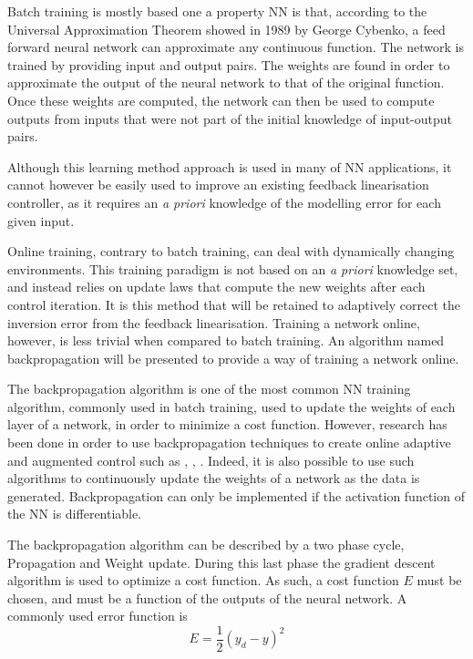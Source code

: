 Batch training is mostly based one a property NN is that, according to the Universal Approximation Theorem showed in 1989 by George Cybenko, a feed forward neural network can approximate any continuous function. The network is trained by providing input and output pairs. The weights are found in order to approximate the output of the neural network to that of the original function. Once these weights are computed, the network can then be used to compute outputs from inputs that were not part of the initial knowledge of input-output pairs.

Although this learning method approach is used in many of NN applications, it cannot however be easily used to improve an existing feedback linearisation  controller, as it requires an \textit{a priori} knowledge of the modelling error for each given input.

Online training, contrary to batch training, can deal with dynamically changing environments. This training paradigm is not based on an \textit{a priori} knowledge set, and instead relies on update laws that compute the new weights after each control iteration. It is this method that will be retained to adaptively correct the inversion error from the feedback linearisation. Training a network online, however, is less trivial when compared to batch training. An algorithm named backpropagation will be presented to provide a way of training a network online.  


The backpropagation algorithm is one of the most common NN training algorithm, commonly used in batch training, used to update the weights of each layer of a network, in order to minimize a cost function. However, research has been done in order to use backpropagation techniques to create online adaptive and augmented control such as \cite{online_adaptiveNN}, \cite{UAV_adaptive}, \cite{UAV_adaptive2}. Indeed, it is also possible to use such algorithms to continuously update the weights of a network as the data is generated. Backpropagation can only be implemented if the activation function of the NN is differentiable. 

The backpropagation algorithm can be described by a two phase cycle, Propagation and Weight update. During this last phase the gradient descent algorithm is used to optimize a cost function. As such, a cost function $E$ must be chosen, and must be a function of the outputs of the neural network. A commonly used error function is 
\begin{equation}
E=\frac{1}{2} (y_d-y)^2
\end{equation}

